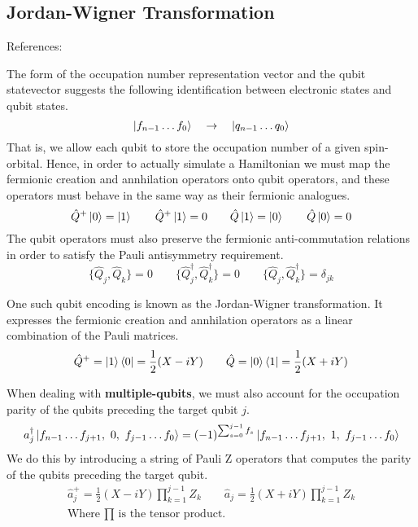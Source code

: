 \subsection{\label{fermion-qubit-encodings}Jordan-Wigner Transformation}
References: \cite{Seeley2020}

The form of the occupation number representation vector and the qubit statevector suggests the following identification between electronic states and qubit states.
\begin{equation*}
    \ket{f_{n-1} \dots f_{0}} \quad\rightarrow\quad \ket{q_{n-1} \dots q_{0}}
\end{equation*}
That is, we allow each qubit to store the occupation number of a given spin-orbital. Hence, in order to actually simulate a Hamiltonian we must map the fermionic creation and annhilation operators onto qubit operators, and these operators must behave in the same way as their fermionic analogues.
\begin{equation*}
    \hat Q^+ \ket 0 = \ket 1 \qquad
    \hat Q^+ \ket 1 = 0 \qquad
    \hat Q \ket 1 = \ket 0 \qquad
    \hat Q \ket 0 = 0
\end{equation*}
The qubit operators must also preserve the fermionic anti-commutation relations in order to satisfy the Pauli antisymmetry requirement.
\begin{equation*}
    \{ \hat Q_{j}, \hat Q_{k} \} = 0 \qquad
    \{ \hat Q_{j}^{\dagger}, \hat Q_{k}^{\dagger} \} = 0 \qquad
    \{ \hat Q_{j}, \hat Q_{k}^{\dagger} \} = \delta_{jk}
\end{equation*}

One such qubit encoding is known as the Jordan-Wigner transformation. It expresses the fermionic creation and annhilation operators as a linear combination of the Pauli matrices.
\begin{equation*}
    \hat Q^+ = \ket 1 \bra 0 = \frac{1}{2} (X - iY) \qquad \hat Q = \ket 0 \bra 1 = \frac{1}{2} (X + iY) 
\end{equation*}

When dealing with \textbf{multiple-qubits}, we must also account for the occupation parity of the qubits preceding the target qubit $j$.
\begin{equation*}
    a_j^\dagger \ket{f_{n-1} \dots f_{j+1},\,\, 0,\,\, f_{j-1} \dots f_0} = (-1)^{\sum_{s=0}^{j-1} f_s} \ket{f_{n-1} \dots f_{j+1},\,\, 1,\,\, f_{j-1} \dots f_0}
\end{equation*}
We do this by introducing a string of Pauli Z operators that computes the parity of the qubits preceding the target qubit.
\begin{equation*}
\begin{gathered}
    \hat a_j^+ = \frac{1}{2} (X - iY) \prod_{k=1}^{j-1} Z_k \qquad
    \hat a_j = \frac{1}{2} (X + iY) \prod_{k=1}^{j-1} Z_k \\[2ex]
    \text{Where $\prod$ is the tensor product.}
\end{gathered}
\end{equation*}

